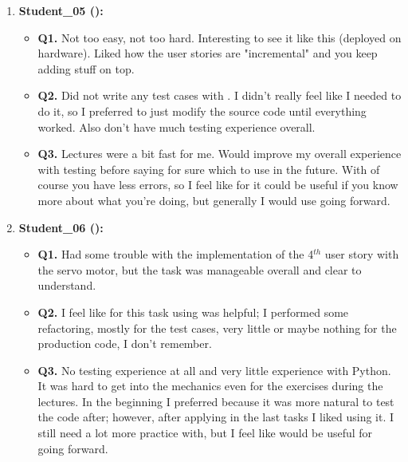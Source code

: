 \begin{enumerate}
    \item \textbf{Student\_05 (\tdd):}
    \begin{itemize}
        \item \textbf{Q1.} Not too easy, not too hard. Interesting to see it like this (deployed on hardware). Liked how the user stories are "incremental" and you keep adding stuff on top.
        \item \textbf{Q2.} Did not write any test cases with \notdd. I didn't really feel like I needed to do it, so I preferred to just modify the source code until everything worked. Also don't have much testing experience overall.
        \item \textbf{Q3.} Lectures were a bit fast for me. Would improve my overall experience with testing before saying for sure which to use in the future.  With \tdd of course you have less errors, so I feel like for \ess it could be useful if you know more about what you're doing, but generally I would use \notdd going forward.
    \end{itemize}

    \item \textbf{Student\_06 (\tdd):}
    \begin{itemize}
        \item \textbf{Q1.} Had some trouble with the implementation of the 4$^{th}$ user story with the servo motor, but the task was manageable overall and clear to understand.
        \item \textbf{Q2.} I feel like for this task using \tdd was helpful; I performed some refactoring, mostly for the test cases, very little or maybe nothing for the production code, I don't remember.
        \item \textbf{Q3.} No testing experience at all and very little experience with Python. It was hard to get into the mechanics even for the exercises during the lectures. In the beginning I preferred \notdd because it was more natural to test the code after; however, after applying \tdd in the last tasks I liked using it. I still need a lot more practice with, but I feel like \tdd would be useful for \ess going forward.
    \end{itemize}


\end{enumerate}
